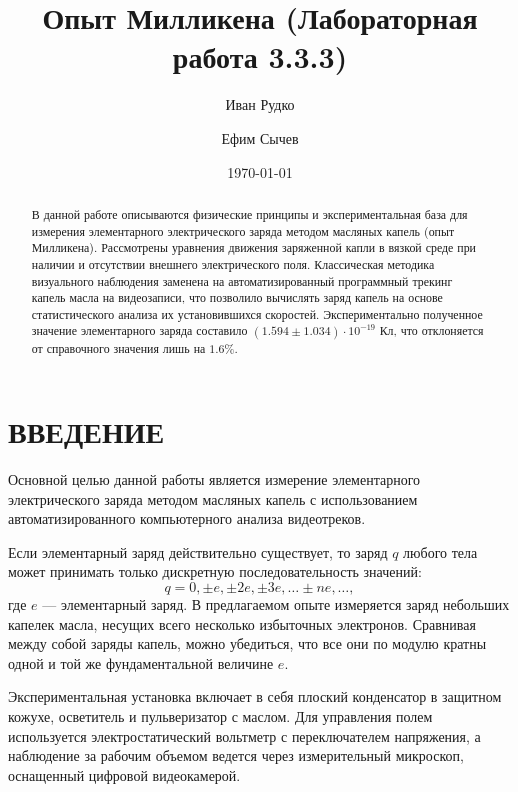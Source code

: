 \documentclass[reprint, amsmath, amssymb, aps, pra, nofootinbib]{revtex4-2}
\begin{document}
\title{Опыт Милликена (Лабораторная работа 3.3.3)}

\author{Иван Рудко}

\author{Ефим Сычев}

\date{\today}

\begin{abstract}
В данной работе описываются физические принципы и экспериментальная база для измерения элементарного электрического заряда методом масляных капель (опыт Милликена). Рассмотрены уравнения движения заряженной капли в вязкой среде при наличии и отсутствии внешнего электрического поля. Классическая методика визуального наблюдения заменена на автоматизированный программный трекинг капель масла на видеозаписи, что позволило вычислять заряд капель на основе статистического анализа их установившихся скоростей. Экспериментально полученное значение элементарного заряда составило $(1.594 \pm 1.034) \cdot 10^{-19}$ Кл, что отклоняется от справочного значения лишь на $1.6\%$.
\end{abstract}

\maketitle

\section{ВВЕДЕНИЕ}
Основной целью данной работы является измерение элементарного электрического заряда методом масляных капель с использованием автоматизированного компьютерного анализа видеотреков.

Если элементарный заряд действительно существует, то заряд $q$ любого тела может принимать только дискретную последовательность значений:
\begin{equation}
    q = 0, \pm e, \pm 2e, \pm 3e, \dots \pm ne, \dots,
    \label{eq:discreteness}
\end{equation}
где $e$ — элементарный заряд. В предлагаемом опыте измеряется заряд небольших капелек масла, несущих всего несколько избыточных электронов. Сравнивая между собой заряды капель, можно убедиться, что все они по модулю кратны одной и той же фундаментальной величине $e$.

Экспериментальная установка включает в себя плоский конденсатор в защитном кожухе, осветитель и пульверизатор с маслом. Для управления полем используется электростатический вольтметр с переключателем напряжения, а наблюдение за рабочим объемом ведется через измерительный микроскоп, оснащенный цифровой видеокамерой.
\end{document}
